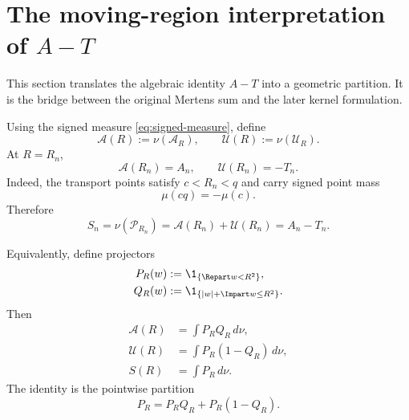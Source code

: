 \section{The moving-region interpretation of $A-T$}
\label{sec:moving-region-AT}

This section translates the algebraic identity $A-T$ into a geometric partition.  It is the bridge between the original Mertens sum and the later kernel formulation.

Using the signed measure \cref{eq:signed-measure}, define
\begin{equation}
 \mathcal A(R):=\nu(\mathscr A_R),
 \qquad
 \mathcal U(R):=\nu(\mathscr U_R).
 \label{eq:AU-measures}
\end{equation}
At $R=R_n$,
\begin{equation}
 \mathcal A(R_n)=A_n,
 \qquad
 \mathcal U(R_n)=-T_n.
 \label{eq:AU-AT}
\end{equation}
Indeed, the transport points satisfy $c<R_n<q$ and carry signed point mass
\[
 \mu(cq)=-\mu(c).
\]
Therefore
\begin{equation}
 \boxed{
 S_n
 =\nu(\mathscr P_{R_n})
 =\mathcal A(R_n)+\mathcal U(R_n)
 =A_n-T_n.
 }
 \label{eq:geometric-AT}
\end{equation}

Equivalently, define projectors
\begin{align}
 P_R(w)&:=\1_{\{\Repart w<R^2\}},
 \label{eq:P-projector}\\
 Q_R(w)&:=\1_{\{|w|+\Impart w\le R^2\}}.
 \label{eq:Q-projector}
\end{align}
Then
\begin{align}
 \mathcal A(R)&=\int P_RQ_R\,d\nu,
 \label{eq:A-projector}\\
 \mathcal U(R)&=\int P_R(1-Q_R)\,d\nu,
 \label{eq:U-projector}\\
 S(R)&=\int P_R\,d\nu.
 \label{eq:S-projector}
\end{align}
The identity is the pointwise partition
\begin{equation}
 P_R=P_RQ_R+P_R(1-Q_R).
 \label{eq:projector-partition}
\end{equation}

